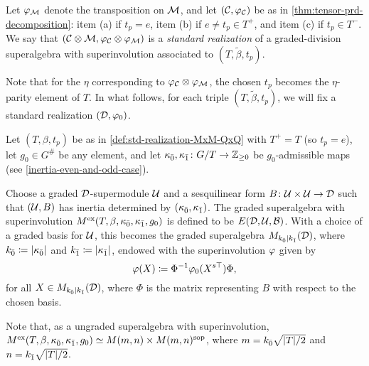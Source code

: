 \begin{defi}
    Let $\varphi_{\mathcal M}$ denote the transposition on $\mathcal M$, and let $(\mathcal C, \varphi_{\mathcal C})$ be as in \cref{thm:tensor-prd-decomposition}: item (a) if $t_p =e$, item (b) if $e \neq t_p \in T^+$, and item (c) if $t_p \in T^-$.
    We say that $(\mathcal C \otimes \mathcal M, \varphi_{\mathcal C} \otimes \varphi_{\mathcal M})$ is a \emph{standard realization} of a graded-division superalgebra with superinvolution associated to $(T, \tilde\beta, t_p)$. 
\end{defi}

Note that for the $\eta$ corresponding to $ \varphi_{\mathcal C} \otimes \varphi_{\mathcal M}$, the chosen $t_p$ becomes the $\eta$-parity element of $T$. 
In what follows, for each triple $(T, \tilde\beta, t_p)$, we will fix a standard realization $(\mathcal{D}, \varphi_0)$. 


\begin{defi}\label{def:model-grd-MxM-even}
    Let $(T, \beta, t_p)$ be as in \cref{def:std-realization-MxM-QxQ} with $T^+ = T$ (so $t_p = e$), 
    let $g_0 \in G^\#$ be any element, and
    let $\kappa_{\bar{0}}, \kappa_{\bar{1}} \colon G/T \to \mathbb{Z}_{\geq 0}$ be  $g_0$-admissible maps (see \cref{inertia-even-and-odd-case}). 
    
    Choose a graded $\mathcal{D}$-supermodule $\mathcal U$ and a sesquilinear form $B\colon {\mathcal U\times \mathcal U} \to \mathcal{D}$ such that $(\mathcal U, B)$ has inertia determined by $(\kappa_{\bar{0}}, \kappa_{\bar{1}})$. 
    The graded superalgebra with superinvolution $M^{\mathrm{ex}}(T, \beta, \kappa_{\bar{0}}, \kappa_{\bar{1}}, g_0)$ is defined to be $E(\mathcal{D}, \mathcal U, \mathcal B)$. 
    With a choice of a graded basis for $\mathcal U$, this becomes
    the graded superalgebra $M_{k_{\bar{0}} | k_{\bar{1}}} (\mathcal{D})$, where $k_{\bar{0}} \coloneqq |\kappa_{\bar{0}}|$ and $k_{\bar{1}} \coloneqq |\kappa_{\bar{1}}|$, endowed with the superinvolution $\varphi$ given by 
    \[
        \varphi(X) \coloneqq \Phi^{-1} \varphi_0(X^{s\top}) \Phi,
    \]
    for all $X \in M_{k_{\bar{0}} | k_{\bar{1}}} (\mathcal{D})$, where $\Phi$ is the matrix representing $B$ with respect to the chosen basis. 
\end{defi}

Note that, as a ungraded superalgebra with superinvolution, $M^{\mathrm{ex}}(T, \beta, \kappa_{\bar{0}}, \kappa_{\bar{1}}, g_0) \simeq M(m,n)\times M(m,n)^{\mathrm{sop}}$, where $m = k_{\bar{0}} \sqrt{|T|/2}$ and $n = k_{\bar{1}} \sqrt{|T|/2}$. 

